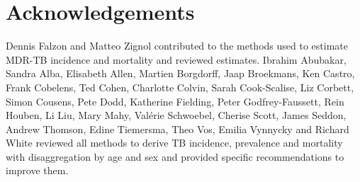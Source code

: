 \section*{Acknowledgements}

Dennis Falzon and Matteo Zignol contributed to the methods used to estimate MDR-TB incidence and mortality and reviewed estimates. Ibrahim Abubakar, Sandra Alba, Elisabeth Allen, Martien Borgdorff, Jaap Broekmans, Ken Castro, Frank Cobelens, Ted Cohen, Charlotte Colvin, Sarah Cook-Scalise, Liz Corbett, Simon Cousens, Pete Dodd, Katherine Fielding, Peter Godfrey-Faussett, Rein Houben, Li Liu, Mary Mahy, Valérie Schwoebel, Cherise Scott, James Seddon, Andrew Thomson, Edine Tiemersma, Theo Vos, Emilia Vynnycky and Richard White reviewed all methods to derive TB incidence, prevalence and mortality with disaggregation by age and sex and provided specific recommendations to improve them.